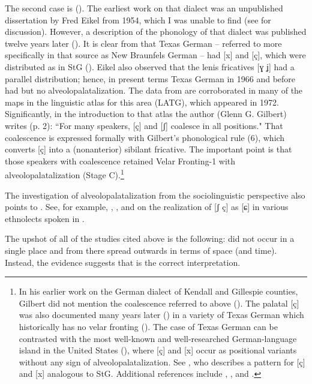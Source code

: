 \begin{xlist}
The second case is  (\citealt{Boas2009}). The earliest work on that dialect was an unpublished dissertation by Fred Eikel from 1954, which I was unable to find (see \citealt{PierceBoasGilbert2018} for discussion). However, a description of the phonology of that dialect was published twelve years later (\citealt{Eikel1966}). It is clear from \citet{Eikel1966} that Texas German -- referred to more specifically in that source as New Braunfels German -- had [x] and [ç], which were distributed as in StG (\citealt[258--260]{Eikel1966}). Eikel also observed that the lenis fricatives [ɣ ʝ] had a parallel distribution; hence, in present terms Texas German in 1966 and before had  but no alveolopalatalization. The data from \citet{Eikel1966} are corroborated in many of the maps in the linguistic atlas for this area (LATG), which appeared in 1972. Significantly, in the introduction to that atlas the author (Glenn G. Gilbert) writes (p. 2): “For many speakers, [ç] and [ʃ] coalesce in all positions." That coalescence is expressed formally with Gilbert's phonological rule (6), which converts [ç] into a (nonanterior) sibilant fricative. The important point is that those speakers with coalescence retained Velar Fronting-1 with alveolopalatalization (Stage C).\footnote{In his earlier work on the German dialect of Kendall and Gillespie counties, Gilbert did not mention the coalescence referred to above (\citealt{Gilbert1963, Gilbert1964, Gilbert1970}). The palatal [ç] was also documented many years later (\citealt[115]{Roesch2012}) in a variety of Texas German which historically has no velar fronting (). The case of Texas German can be contrasted with the most well-known and well-researched German-language island in the United States (), where [ç] and [x] occur as positional variants without any sign of alveolopalatalization. See \citet[277]{Reed1947}, who describes a pattern for [ç] and [x] analogous to StG. Additional references include \citet[4]{Frey1942}, \citet[7]{Buffington1954}, and \citet[78--79; 91--93]{Kelz1971}. }

The investigation of alveolopalatalization from the sociolinguistic perspective also points to . See, for example, \citet[25ff.]{Auer2002}, \citet[38]{Wiese2012}, and \citet{JannedyWeirich2014} on the realization of [ʃ ç] as [ɕ] in various ethnolects spoken in .

The upshot of all of the studies cited above is the following:  did not occur in a single place and from there spread outwards in terms of space (and time). Instead, the evidence suggests that  is the correct interpretation.


\end{xlist}
